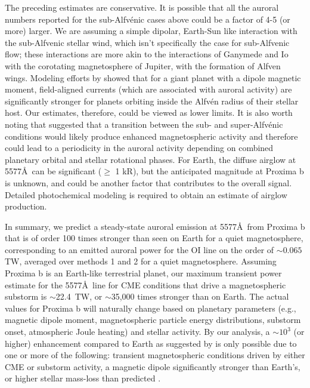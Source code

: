 \documentclass{emulateapj}
\begin{document}
The preceding estimates are conservative.  It is possible that all the auroral numbers reported for the sub-Alfv\'{e}nic cases above could be a factor of 4-5 (or more) larger. We are assuming a simple dipolar, Earth-Sun like interaction with the sub-Alfvenic stellar wind, which isn't specifically the case for sub-Alfvenic flow; these interactions are more akin to the interactions of Ganymede and Io with the corotating magnetosphere of Jupiter, with the formation of Alfven wings. Modeling efforts by \citet{Preusse2007} showed that for a giant planet with a dipole magnetic moment, field-aligned currents (which are associated with auroral activity) are significantly stronger for planets orbiting inside the Alfv\'{e}n radius of their stellar host. Our estimates, therefore, could be viewed as lower limits. It is also worth noting that \citet{Cohen2014} suggested that a transition between the sub- and super-Alfv\'{e}nic conditions would likely produce enhanced magnetospheric activity and therefore could lead to a periodicity in the auroral activity depending on combined planetary orbital and stellar rotational phases. For Earth, the diffuse airglow at 5577\AA\ can be significant ($\geq$ 1 kR), but the anticipated magnitude at Proxima b is unknown, and could be another factor that contributes to the overall signal. Detailed photochemical modeling is required to obtain an estimate of airglow production.

In summary, we predict a steady-state auroral emission at 5577\AA\ from Proxima b that is of order 100 times stronger than seen on Earth for a quiet magnetosphere, corresponding to an emitted auroral power for the OI line on the order of ${\sim} 0.065$ TW, averaged over methods 1 and 2 for a quiet magnetosphere. Assuming Proxima b is an Earth-like terrestrial planet, our maximum transient power estimate for the 5577\AA\ line for CME conditions that drive a magnetospheric substorm is $\sim$22.4~TW, or ${\sim}$35,000 times stronger than on Earth. The actual values for Proxima b will naturally change based on planetary parameters (e.g., magnetic dipole moment, magnetospheric particle energy distributions, substorm onset, atmospheric Joule heating) and stellar activity. By our analysis, a ${\sim} 10^3$ (or higher) enhancement compared to Earth as suggested by \citet{OMalley2016} is only possible due to one or more of the following: transient magnetospheric conditions driven by either CME or substorm activity, a magnetic dipole significantly stronger than Earth's, or higher stellar mass-loss than predicted \citep{Wood2005,Cohen2014}.
\end{document}
